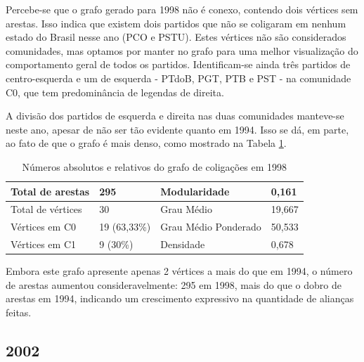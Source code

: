 Percebe-se que o grafo gerado para 1998 não é conexo, contendo dois vértices sem arestas. Isso indica que existem dois partidos que não se coligaram em nenhum estado do Brasil nesse ano (\gls{PCO} e \gls{PSTU}). Estes vértices não são considerados comunidades, mas optamos por manter no grafo para uma melhor visualização do comportamento geral de todos os partidos. Identificam-se ainda três partidos de centro-esquerda e um de esquerda - \gls{PTdoB}, \gls{PGT}, \gls{PTB} e \gls{PST} - na comunidade C0, que tem predominância de legendas de direita.

A divisão dos partidos de esquerda e direita nas duas comunidades manteve-se neste ano, apesar de não ser tão evidente quanto em 1994. Isso se dá, em parte, ao fato de que o grafo é mais denso, como mostrado na Tabela \ref{table-1998}.



\begin{table}[H]
\centering
\label{table-1998}
\begin{tabular}{|l|l|l|l|}
\hline
Total de arestas  & 295 & Modularidade         & 0,161 \\ \hline
Total de vértices & 30  & Grau Médio           & 19,667 \\ \hline
Vértices em C0    & 19  (63,33\%) & Grau Médio Ponderado & 50,533 \\ \hline
Vértices em C1    & 9 (30\%) & Densidade            &  0,678\\ \hline
\end{tabular}
\caption{Números absolutos e relativos do grafo de coligações em 1998}
\end{table}

Embora este grafo apresente apenas 2 vértices a mais do que em 1994, o número de arestas aumentou consideravelmente: 295 em 1998, mais do que o dobro de arestas em 1994, indicando um crescimento expressivo na quantidade de alianças feitas.


\subsection{2002}
\label{resultados__grafos--2002}

